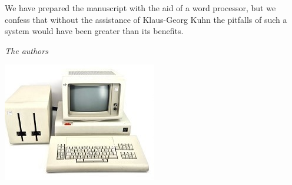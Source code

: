 We have prepared the manuscript with the aid of a word processor, but we confess that without the assistance of 
Klaus-Georg Kuhn the pitfalls of such a system would have been greater than its benefits.
\vspace{.5cm}
\begin{flushright}\noindent
${}$\hfill {\itshape The authors} \\
\end{flushright}

\vspace{.5cm}
\begin{center}
\includegraphics{./part-0/apparaetle.jpg}
\end{center}



